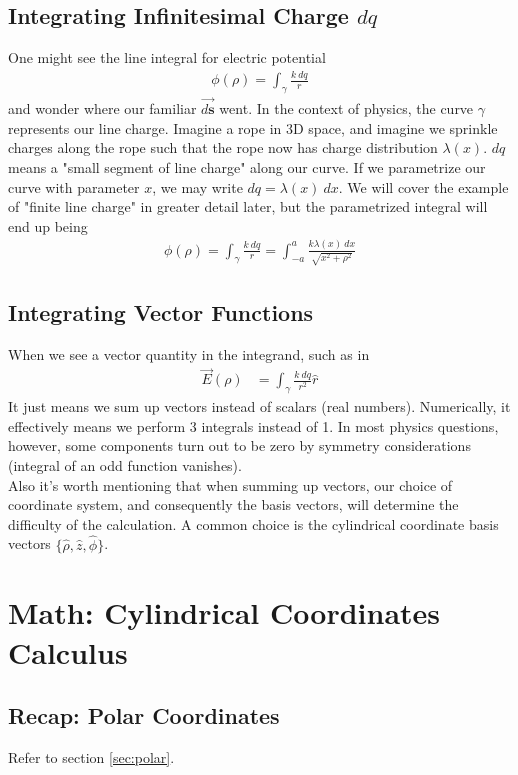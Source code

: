 \documentclass{article}
\begin{document}
\subsection{Integrating Infinitesimal Charge $dq$}
One might see the line integral for electric potential \begin{align}
    \phi(\rho)=\int_\gamma \frac{k\ d q}{r}
\end{align}
and wonder where our familiar $\overrightarrow{d\mathbf{s}}$ went. In the context of physics, the curve $\gamma$ represents our line charge. Imagine a rope in 3D space, and imagine we sprinkle charges along the rope such that the rope now has charge distribution $\lambda(x)$. $dq$ means a "small segment of line charge" along our curve. If we parametrize our curve with parameter $x$, we may write $dq = \lambda(x)\ dx$. We will cover the example of "finite line charge" in greater detail later, but the parametrized integral will end up being 
\begin{align}
    \phi(\rho)=\int_\gamma \frac{k\ d q}{r} = \int_{-a}^a \frac{k \lambda(x)\ dx}{\sqrt{x^2 + \rho^2}}
\end{align}
\subsection{Integrating Vector Functions}
When we see a vector quantity in the integrand, such as in 
\begin{align}
    \vec{E}(\rho) &= \int_\gamma \frac{k \ dq}{r^2} \hat{r}
\end{align}
It just means we sum up vectors instead of scalars (real numbers). Numerically, it effectively means we perform 3 integrals instead of 1. In most physics questions, however, some components turn out to be zero by symmetry considerations (integral of an odd function vanishes). \\[10pt]
Also it's worth mentioning that when summing up vectors, our choice of coordinate system, and consequently the basis vectors, will determine the difficulty of the calculation. A common choice is the cylindrical coordinate basis vectors $\{\hat{\rho}, \hat{z}, \hat{\phi} \}$.

\section{Math: Cylindrical Coordinates Calculus}
\subsection{Recap: Polar Coordinates}
Refer to section \ref{sec:polar}.
\end{document}
